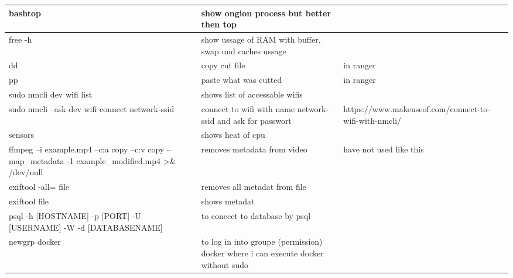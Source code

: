 \documentclass[12pt]{article}
\begin{document}
\begin{tabular}{| p{6.5cm} | p{6.5cm} | p{6.5cm} |}
    \hline
    bashtop & show ongion process but better then top & \\
    \hline
    free -h & show ussage of RAM with buffer, swap und caches ussage & \\
    \hline 
    dd & copy cut file & in ranger \\
    \hline
    pp & paste what was cutted & in ranger \\
    \hline
    sudo nmcli dev wifi list & shows list of accessable wifis &\\
    \hline
    sudo nmcli --ask dev wifi connect network-ssid & connect to wifi with name network-ssid and ask for passwort & https://www.makeuseof.com/connect-to-wifi-with-nmcli/ \\
    \hline
    sensors & shows heat of cpu& \\
    \hline
    ffmpeg –i example.mp4 –c:a copy –c:v copy –map\_metadata -1 example\_modified.mp4 >\& /dev/null & removes metadata from video & have not used like this \\
    \hline
    exiftool -all= file & removes all metadat from file & \\
    \hline 
    exiftool file & shows metadat & \\
    \hline
    psql -h [HOSTNAME] -p [PORT] -U [USERNAME] -W -d [DATABASENAME] & to conecct to database by psql & \\
    \hline
    newgrp docker & to log in into groupe (permission) docker where i can execute docker without sudo &\\

\end{tabular}
\end{document}
